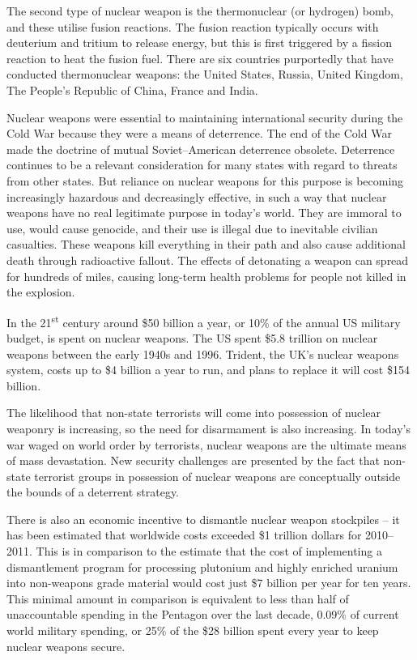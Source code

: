 \documentclass[twoside,titlepage,11pt,twocolumn,a4paper]{article}
\begin{document}
The second type of nuclear weapon is the thermonuclear (or hydrogen)
bomb, and these utilise fusion reactions.  The fusion reaction
typically occurs with deuterium and tritium to release energy, but
this is first triggered by a fission reaction to heat the fusion
fuel. There are six countries purportedly that have conducted
thermonuclear weapons: the United States, Russia, United Kingdom, The
People's Republic of China, France and India.

Nuclear weapons were essential to maintaining international security
during the Cold War because they were a means of deterrence. The end
of the Cold War made the doctrine of mutual Soviet--American
deterrence obsolete. Deterrence continues to be a relevant
consideration for many states with regard to threats from other
states. But reliance on nuclear weapons for this purpose is becoming
increasingly hazardous and decreasingly effective, in such a way that
nuclear weapons have no real legitimate purpose in today’s world. They
are immoral to use, would cause genocide, and their use is illegal due
to inevitable civilian casualties. These weapons kill everything in
their path and also cause additional death through radioactive
fallout. The effects of detonating a weapon can spread for hundreds of
miles, causing long-term health problems for people not killed in the
explosion.

In the 21\textsuperscript{st} century around \$50 billion a year, or
10\% of the annual US military budget, is spent on nuclear
weapons. \citep{USspending} The US spent \$5.8 trillion on nuclear
weapons between the early 1940s and 1996. Trident, the UK's nuclear
weapons system, costs up to \$4 billion a year to run, and plans to
replace it will cost \$154 billion.

The likelihood that non-state terrorists will come into possession of
nuclear weaponry is increasing, so the need for disarmament is also
increasing. In today's war waged on world order by terrorists, nuclear
weapons are the ultimate means of mass devastation. New security
challenges are presented by the fact that non-state terrorist groups
in possession of nuclear weapons are conceptually outside the bounds
of a deterrent strategy.

There is also an economic incentive to dismantle nuclear weapon
stockpiles -- it has been estimated that worldwide costs exceeded \$1
trillion dollars for 2010--2011. \citep{worldSpending} This is in
comparison to the estimate that the cost of implementing a
dismantlement program for processing plutonium and highly enriched
uranium into non-weapons grade material would cost just \$7 billion
per year for ten years. \citep{worldSafe} This minimal amount in
comparison is equivalent to less than half of unaccountable spending
in the Pentagon over the last decade, 0.09\% of current world military
spending, or 25\% of the \$28 billion spent every year to keep nuclear
weapons secure.
\end{document}
